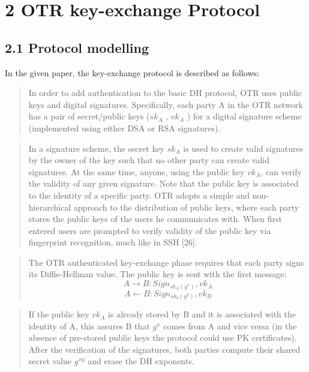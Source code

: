 \documentclass[
]{article}
\author{}
\date{}
\begin{document}
\hypertarget{otr-key-exchange-protocol}{%
\section{2 OTR key-exchange Protocol}\label{otr-key-exchange-protocol}}

\hypertarget{protocol-modelling}{%
\subsection{2.1 Protocol modelling}\label{protocol-modelling}}

In the given paper, the key-exchange protocol is described as follows:

\begin{quote}
In order to add authentication to the basic DH protocol, OTR uses public keys and digital signatures. Specifically, each party A in the OTR network has a pair of secret/public keys ($sk_A$ , $vk_A$ ) for a digital signature scheme (implemented using either DSA or RSA signatures).
\end{quote}

\begin{quote}
In a signature scheme, the secret key $sk_A$ is used to create valid signatures by the owner of the key such that no other party can create valid signatures. At the same time, anyone, using the public key $vk_A$, can verify the validity of any given signature. Note that the public key is associated to the identity of a specific party. OTR adopts a simple and non-hierarchical approach to the distribution of public keys, where each party stores the public keys of the users he communicates with. When first entered users are prompted to verify validity of the public key via fingerprint recognition, much like in SSH {[}26{]}.
\end{quote}

\begin{quote}
The OTR authenticated key-exchange phase requires that each party signs its Diffie-Hellman value. The public key is sent with the first message:
\begin{displaymath}
A \rightarrow B : Sign_{sk_A(g^x)}, vk_A
\end{displaymath}
\begin{displaymath}
A \leftarrow B : Sign_{sk_b(g^y)}, vk_B
\end{displaymath}
\end{quote}

\begin{quote}
If the public key $vk_A$ is already stored by B and it is associated with the identity of A, this assures B that $g^x$ comes from A and vice versa (in the absence of pre-stored public keys the protocol could use PK certificates). After the verification of the signatures, both parties compute their shared secret value $g^{xy}$ and erase the DH exponents.
\end{quote}
\end{document}
